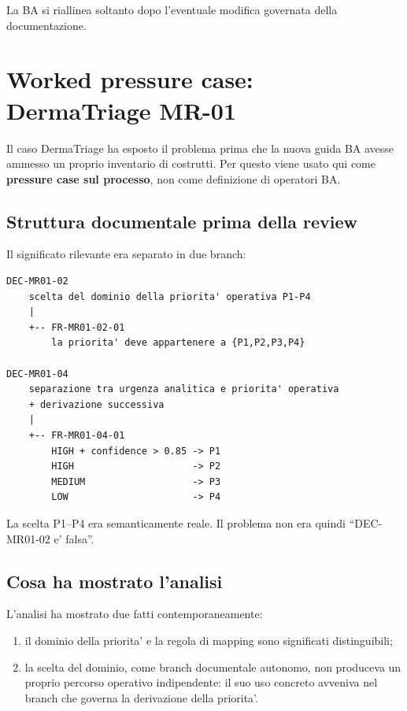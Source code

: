 \documentclass[11pt,a4paper]{article}
\begin{document}
La BA si riallinea soltanto dopo l'eventuale modifica governata della documentazione.

\section{Worked pressure case: DermaTriage MR-01}

Il caso DermaTriage ha esposto il problema prima che la nuova guida BA avesse ammesso un proprio inventario di costrutti. Per questo viene usato qui come \textbf{pressure case sul processo}, non come definizione di operatori BA.

\subsection{Struttura documentale prima della review}

Il significato rilevante era separato in due branch:

\begin{lstlisting}
DEC-MR01-02
    scelta del dominio della priorita' operativa P1-P4
    |
    +-- FR-MR01-02-01
        la priorita' deve appartenere a {P1,P2,P3,P4}

DEC-MR01-04
    separazione tra urgenza analitica e priorita' operativa
    + derivazione successiva
    |
    +-- FR-MR01-04-01
        HIGH + confidence > 0.85 -> P1
        HIGH                     -> P2
        MEDIUM                   -> P3
        LOW                      -> P4
\end{lstlisting}

La scelta P1--P4 era semanticamente reale. Il problema non era quindi ``DEC-MR01-02 e' falsa''.

\subsection{Cosa ha mostrato l'analisi}

L'analisi ha mostrato due fatti contemporaneamente:

\begin{enumerate}
  \item il dominio della priorita' e la regola di mapping sono significati distinguibili;
  \item la scelta del dominio, come branch documentale autonomo, non produceva un proprio percorso operativo indipendente: il suo uso concreto avveniva nel branch che governa la derivazione della priorita'.
\end{enumerate}
\end{document}
